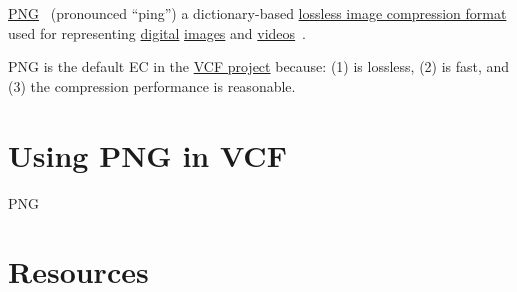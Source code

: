 \href{https://en.wikipedia.org/wiki/Portable_Network_Graphics}{PNG}~\cite{vruiz__PNG}
(pronounced ``ping'') a dictionary-based
\href{https://en.wikipedia.org/wiki/Lossless_compression}{lossless
  image compression format} used for representing
\href{https://en.wikipedia.org/wiki/Digital_data}{digital}
\href{https://en.wikipedia.org/wiki/Digital_image}{images} and
\href{https://en.wikipedia.org/wiki/Video}{videos}~\cite{vruiz__image_video}.

PNG is the default EC in the
\href{https://github.com/Sistemas-Multimedia/VCF}{VCF project}
because: (1) is lossless, (2) is fast, and (3) the compression
performance is reasonable.

\section{Using PNG in VCF}

PNG 

\section{Resources}

\renewcommand{\addcontentsline}[3]{}%

